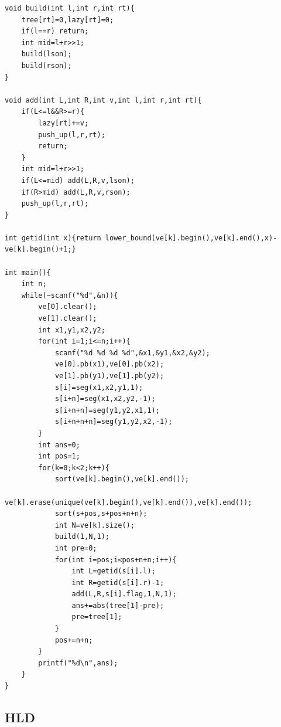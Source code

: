 \documentclass[twoside]{article}
\begin{document}
\begin{lstlisting}
void build(int l,int r,int rt){
    tree[rt]=0,lazy[rt]=0;
    if(l==r) return;
    int mid=l+r>>1;
    build(lson);
    build(rson);
}

void add(int L,int R,int v,int l,int r,int rt){
    if(L<=l&&R>=r){
        lazy[rt]+=v;
        push_up(l,r,rt);
        return;
    }
    int mid=l+r>>1;
    if(L<=mid) add(L,R,v,lson);
    if(R>mid) add(L,R,v,rson);
    push_up(l,r,rt);
}

int getid(int x){return lower_bound(ve[k].begin(),ve[k].end(),x)-ve[k].begin()+1;}

int main(){
    int n;
    while(~scanf("%d",&n)){
        ve[0].clear();
        ve[1].clear();
        int x1,y1,x2,y2;
        for(int i=1;i<=n;i++){
            scanf("%d %d %d %d",&x1,&y1,&x2,&y2);
            ve[0].pb(x1),ve[0].pb(x2);
            ve[1].pb(y1),ve[1].pb(y2);
            s[i]=seg(x1,x2,y1,1);
            s[i+n]=seg(x1,x2,y2,-1);
            s[i+n+n]=seg(y1,y2,x1,1);
            s[i+n+n+n]=seg(y1,y2,x2,-1);
        }
        int ans=0;
        int pos=1;
        for(k=0;k<2;k++){
            sort(ve[k].begin(),ve[k].end());
            ve[k].erase(unique(ve[k].begin(),ve[k].end()),ve[k].end());
            sort(s+pos,s+pos+n+n);
            int N=ve[k].size();
            build(1,N,1);
            int pre=0;
            for(int i=pos;i<pos+n+n;i++){
                int L=getid(s[i].l);
                int R=getid(s[i].r)-1;
                add(L,R,s[i].flag,1,N,1);
                ans+=abs(tree[1]-pre);
                pre=tree[1];
            }
            pos+=n+n;
        }
        printf("%d\n",ans);
    }
}\end{lstlisting}
\subsection{HLD}
\end{document}
